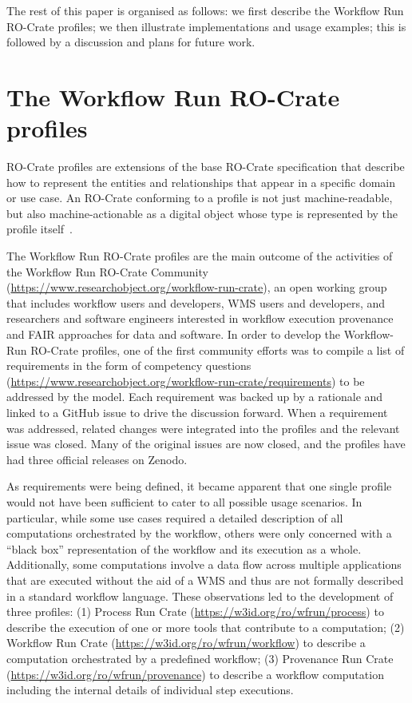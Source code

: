 \documentclass[10pt,letterpaper]{article}
\begin{document}
The rest of this paper is organised as follows: we first describe the Workflow Run RO-Crate profiles; we then illustrate implementations and usage examples; this is followed by a discussion and plans for future work.


\section{The Workflow Run RO-Crate profiles}\label{the-workflow-run-ro-crate-profiles}

RO-Crate profiles are extensions of the base RO-Crate specification that describe how to represent the entities and relationships that appear in a specific domain or use case.
An RO-Crate conforming to a profile is not just machine-readable, but also machine-actionable as a digital object whose type is represented by the profile itself~\cite{Soiland-Reyes 2022b}.

The Workflow Run RO-Crate profiles are the main outcome of the activities of the Workflow Run RO-Crate Community (\url{https://www.researchobject.org/workflow-run-crate}), an open working group that includes workflow users and developers, WMS users and developers, and researchers and software engineers interested in workflow execution provenance and FAIR approaches for data and software.
In order to develop the Workflow-Run RO-Crate profiles, one of the first community efforts was to compile a list of requirements in the form of competency questions (\url{https://www.researchobject.org/workflow-run-crate/requirements}) to be addressed by the model.
Each requirement was backed up by a rationale and linked to a GitHub issue to drive the discussion forward. When a requirement was addressed, related changes were integrated into the profiles and the relevant issue was closed. Many of the original issues are now closed, and the profiles have had three official releases on Zenodo.


As requirements were being defined, it became apparent that one single profile would not have been sufficient to cater to all possible usage scenarios.
In particular, while some use cases required a detailed description of all computations orchestrated by the workflow, others were only concerned with a ``black box'' representation of the workflow and its execution as a whole.
Additionally, some computations involve a data flow across multiple applications that are executed without the aid of a WMS and thus are not formally described in a standard workflow language.
These observations led to the development of three profiles: 
(1) Process Run Crate (\url{https://w3id.org/ro/wfrun/process})
\cite{WRROC 2023a} to describe the execution of one or more tools that contribute to a computation;
(2) Workflow Run Crate (\url{https://w3id.org/ro/wfrun/workflow})
\cite{WRROC 2023b} to describe a computation orchestrated by a predefined workflow; 
(3) Provenance Run Crate (\url{https://w3id.org/ro/wfrun/provenance})
\cite{WRROC 2023c} to describe a workflow computation including the internal details of individual step executions.
\end{document}
